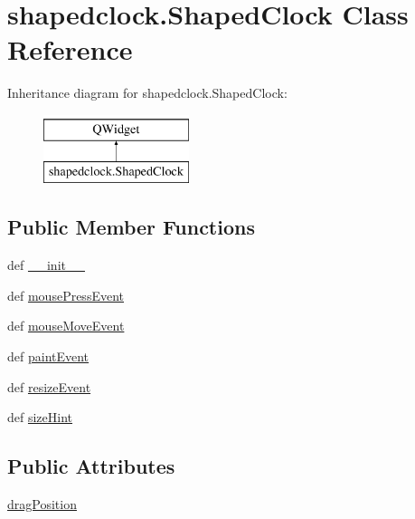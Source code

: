 \hypertarget{classshapedclock_1_1ShapedClock}{}\section{shapedclock.\+Shaped\+Clock Class Reference}
\label{classshapedclock_1_1ShapedClock}
Inheritance diagram for shapedclock.\+Shaped\+Clock\+:\begin{figure}[H]
\begin{center}
\leavevmode
\includegraphics[height=2.000000cm]{classshapedclock_1_1ShapedClock}
\end{center}
\end{figure}
\subsection*{Public Member Functions}
\begin{DoxyCompactItemize}
\item 
def \hyperlink{classshapedclock_1_1ShapedClock_ab4e95666bb38c1797ac7040a83508328}{\+\_\+\+\_\+init\+\_\+\+\_\+}
\item 
def \hyperlink{classshapedclock_1_1ShapedClock_acff9e7eea67287d28ee9a04dc68f873f}{mouse\+Press\+Event}
\item 
def \hyperlink{classshapedclock_1_1ShapedClock_a5a567a6f5855683df362ed2279411f23}{mouse\+Move\+Event}
\item 
def \hyperlink{classshapedclock_1_1ShapedClock_a7cc521c98b1ceb0e58bcc0cf6c09c540}{paint\+Event}
\item 
def \hyperlink{classshapedclock_1_1ShapedClock_af0aaf425f9e9d5494df16ccb1019e5ab}{resize\+Event}
\item 
def \hyperlink{classshapedclock_1_1ShapedClock_ad6da8452b85113a95c1a47b6d4aba271}{size\+Hint}
\end{DoxyCompactItemize}
\subsection*{Public Attributes}
\begin{DoxyCompactItemize}
\item 
\hyperlink{classshapedclock_1_1ShapedClock_af8e168feb213e08b7fc2b97c62efd2d5}{drag\+Position}
\end{DoxyCompactItemize}
